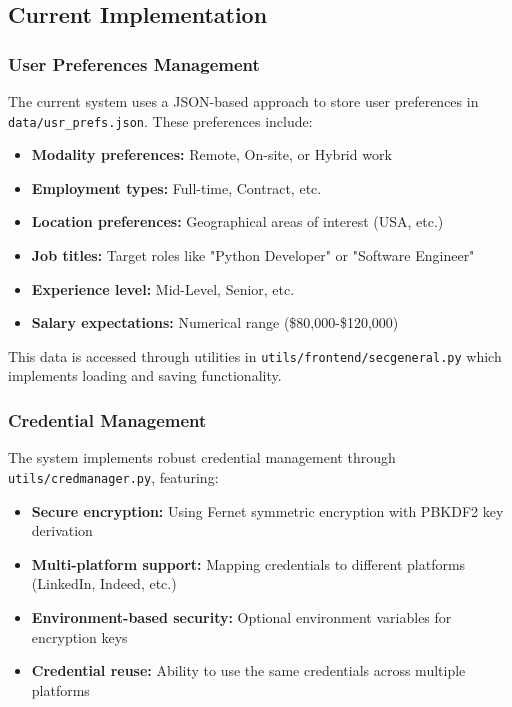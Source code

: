 \documentclass[a4paper,12pt]{article}
\begin{document}
\subsection{Current Implementation}
\subsubsection{User Preferences Management}

The current system uses a JSON-based approach to store user preferences in \texttt{data/usr\_prefs.json}. These preferences include:

\begin{itemize}
    \item \textbf{Modality preferences:} Remote, On-site, or Hybrid work
    \item \textbf{Employment types:} Full-time, Contract, etc.
    \item \textbf{Location preferences:} Geographical areas of interest (USA, etc.)
    \item \textbf{Job titles:} Target roles like "Python Developer" or "Software Engineer"
    \item \textbf{Experience level:} Mid-Level, Senior, etc.
    \item \textbf{Salary expectations:} Numerical range (\$80,000-\$120,000)
\end{itemize}

This data is accessed through utilities in \texttt{utils/frontend/secgeneral.py} which implements loading and saving functionality.

\subsubsection{Credential Management}

The system implements robust credential management through \texttt{utils/credmanager.py}, featuring:

\begin{itemize}
    \item \textbf{Secure encryption:} Using Fernet symmetric encryption with PBKDF2 key derivation
    \item \textbf{Multi-platform support:} Mapping credentials to different platforms (LinkedIn, Indeed, etc.)
    \item \textbf{Environment-based security:} Optional environment variables for encryption keys
    \item \textbf{Credential reuse:} Ability to use the same credentials across multiple platforms
\end{itemize}
\end{document}
